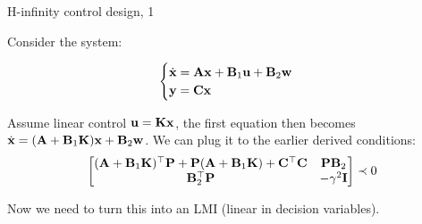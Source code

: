 \documentclass{beamer}
\begin{document}
	
	\begin{frame}{H-infinity control design, 1}
		\begin{flushleft}
			
			Consider the system:
			
			\begin{equation}
				\begin{cases}
					\dot{\mathbf{x}} = \mathbf{A}\mathbf{x}+\mathbf{B}_1\mathbf{u}+\mathbf{B}_2\mathbf{w}
					\\
					\mathbf{y} = \mathbf{C}\mathbf{x}
				\end{cases}
			\end{equation}
			
			Assume linear control $\mathbf{u} = \mathbf{K}\mathbf{x}$, the first equation then becomes $\dot{\mathbf{x}} = (\mathbf{A}+\mathbf{B}_1\mathbf{K})\mathbf{x}+\mathbf{B}_2\mathbf{w}$. We can plug it to the earlier derived conditions:
			\begin{align}
				\begin{bmatrix}
					(\mathbf{A}+\mathbf{B}_1\mathbf{K})^\top\mathbf{P}+\mathbf{P}(\mathbf{A}+\mathbf{B}_1\mathbf{K})+\mathbf{C}^\top\mathbf{C} & \mathbf{P}\mathbf{B}_2 \\
					\mathbf{B}_2^\top\mathbf{P}  & -\gamma^2 \mathbf{I}
				\end{bmatrix}
				\prec 0
			\end{align}
			
			Now we need to turn this into an LMI (linear in decision variables).
			
		\end{flushleft}
	\end{frame}
\end{document}
